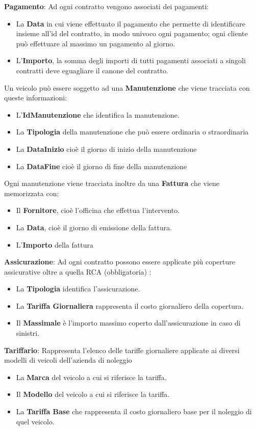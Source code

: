 \documentclass[10pt,a4paper]{article}
\begin{document}
\noindent
\textbf{Pagamento}: Ad ogni contratto vengono associati dei pagamenti: 
\begin{itemize}
    \item La \textbf{Data} in cui viene effettuato il pagamento che permette di identificare insieme all'id del contratto, in modo univoco ogni pagamento; ogni cliente può effettuare al massimo un pagamento al giorno.
    \item L'\textbf{Importo}, la somma degli importi di tutti pagamenti associati a singoli contratti deve eguagliare il canone del contratto.
\end{itemize}
\noindent
Un veicolo può essere soggetto ad una \textbf{Manutenzione} che viene tracciata con queste informazioni: 
\begin{itemize}
    \item L'\textbf{IdManutenzione} che identifica la manutenzione.
    \item La \textbf{Tipologia} della manutenzione che può essere ordinaria o straordinaria
    \item La \textbf{DataInizio} cioè il giorno di inizio della manutenzione
    \item La \textbf{DataFine} cioè il giorno di fine della manutenzione
\end{itemize}
\noindent
Ogni manutenzione viene tracciata inoltre da una \textbf{Fattura} che viene memorizzata con: 
\begin{itemize}
    \item Il \textbf{Fornitore}, cioè l'officina che effettua l'intervento.
    \item La \textbf{Data}, cioè il giorno di emissione della fattura.
    \item L'\textbf{Importo} della fattura
\end{itemize}
\noindent
\textbf{Assicurazione}: Ad ogni contratto possono essere applicate più coperture assicurative oltre a quella RCA (obbligatoria) : 
\begin{itemize}
    \item La \textbf{Tipologia} identifica l'assicurazione.
    \item La \textbf{Tariffa Giornaliera} rappresenta il costo giornaliero della copertura.
    \item Il \textbf{Massimale} è l'importo massimo coperto dall'assicurazione in caso di sinistri.
\end{itemize}
\noindent
\textbf{Tariffario}: Rappresenta l'elenco delle tariffe giornaliere applicate ai diversi modelli di veicoli dell'azienda di noleggio
\begin{itemize}
    \item La \textbf{Marca} del veicolo a cui si riferisce la tariffa.
    \item Il \textbf{Modello} del veicolo a cui si riferisce la tariffa.
    \item La \textbf{Tariffa Base} che rappresenta il costo giornaliero base per il noleggio di quel veicolo.
\end{itemize}
\end{document}
